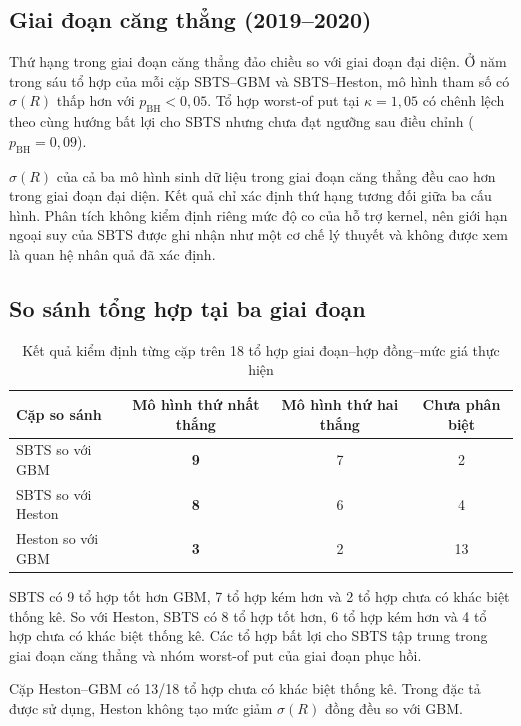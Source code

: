\subsection{Giai đoạn căng thẳng (2019--2020)}

Thứ hạng trong giai đoạn căng thẳng đảo chiều so với giai đoạn đại diện. Ở năm trong sáu tổ hợp của mỗi cặp
SBTS--GBM và SBTS--Heston, mô hình tham số có $\sigma(R)$ thấp hơn với
$p_{\mathrm{BH}}<0{,}05$. Tổ hợp worst-of put tại $\kappa=1{,}05$ có chênh lệch theo
cùng hướng bất lợi cho SBTS nhưng chưa đạt ngưỡng sau điều chỉnh
($p_{\mathrm{BH}}=0{,}09$).

$\sigma(R)$ của cả ba mô hình sinh dữ liệu trong giai đoạn căng thẳng đều cao hơn trong giai đoạn đại diện.
Kết quả chỉ xác định thứ hạng tương đối giữa ba cấu hình. Phân tích không kiểm
định riêng mức độ co của hỗ trợ kernel, nên giới hạn ngoại suy của SBTS được
ghi nhận như một cơ chế lý thuyết và không được xem là quan hệ nhân quả đã xác
định.

\subsection{So sánh tổng hợp tại ba giai đoạn}

\begin{table}[H]
\centering
\small
\caption{Kết quả kiểm định từng cặp trên 18 tổ hợp giai đoạn--hợp đồng--mức giá thực hiện}
\label{tab:c4-scoreboard}
\begin{tabular}{@{}lccc@{}}
\toprule
\textbf{Cặp so sánh} & \textbf{Mô hình thứ nhất thắng} &
\textbf{Mô hình thứ hai thắng} & \textbf{Chưa phân biệt}\\
\midrule
SBTS so với GBM & \textbf{9} & 7 & 2\\
SBTS so với Heston & \textbf{8} & 6 & 4\\
Heston so với GBM & \textbf{3} & 2 & 13\\
\bottomrule
\end{tabular}
\end{table}

SBTS có 9 tổ hợp tốt hơn GBM, 7 tổ hợp kém hơn và 2 tổ hợp chưa có khác biệt
thống kê. So với Heston, SBTS có 8 tổ hợp tốt hơn, 6 tổ hợp kém hơn và 4 tổ
hợp chưa có khác biệt thống kê. Các tổ hợp bất lợi cho SBTS tập trung trong
giai đoạn căng thẳng và nhóm worst-of put của giai đoạn phục hồi.

Cặp Heston--GBM có 13/18 tổ hợp chưa có khác biệt thống kê. Trong đặc tả được
sử dụng, Heston không tạo mức giảm $\sigma(R)$ đồng đều so với GBM.

